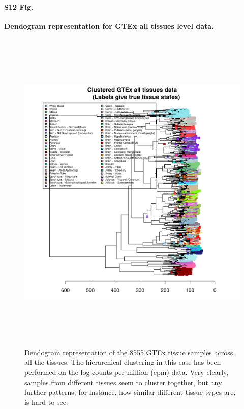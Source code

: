 \documentclass[10pt,letterpaper]{article}
\begin{document}
\paragraph*{S12 Fig.}

\label{figS12}
{\bf Dendogram representation for GTEx all tissues level data.}
\begin{figure}[ht]
\centering
\includegraphics[height=6.3in, width=6in]{../../plots/dendextend_gtex.pdf}
\caption{Dendogram representation of the 8555 GTEx tissue samples across all the tissues.
The hierarchical clustering in this case has been performed on the log counts per million (cpm) data.
Very clearly, samples from different tissues seem to cluster together, but any further patterns, for instance, how similar different tissue types are, is hard to see.}
\end{figure}
\end{document}
